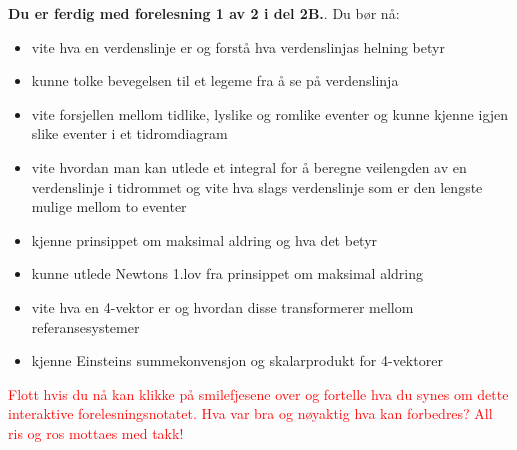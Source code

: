 \documentclass{beamer}
\let\hrefori\href
\renewcommand{\href}[2]{{\setlength{\fboxsep}{1pt}\colorbox{sunset}{\hrefori{#1}{#2}}}}
\newcommand{\pagebutton}[1]{\setbeamertemplate{button}{\tikz\node[inner xsep = 5pt, draw = structure!90, fill = green(ryb), rounded corners = 8pt]{\color{amber}\Large\insertbuttontext};}\beamerbutton{#1}}
\begin{document}
\begin{frame}
\label{oppsummering}
\hyperlink{vv6}{\pagebutton{\small Forrige side}}\href{https://nettskjema.no/a/171403}{ \Changey[1][yellow]{-2}}
{\bf Du er ferdig med forelesning 1 av 2 i del 2B.}. Du bør nå:
\begin{itemize}
\item vite hva en verdenslinje er og forstå hva verdenslinjas helning betyr
\item kunne tolke bevegelsen til et legeme fra å se på verdenslinja
\item vite forsjellen mellom tidlike, lyslike og romlike eventer og kunne kjenne igjen slike eventer i et tidromdiagram
\item vite hvordan man kan utlede et integral for å beregne veilengden av en verdenslinje i tidrommet og vite hva slags verdenslinje som er den lengste mulige mellom to eventer
\item kjenne prinsippet om maksimal aldring og hva det betyr
\item kunne utlede Newtons 1.lov fra prinsippet om maksimal aldring
\item vite hva en 4-vektor er og hvordan disse transformerer mellom referansesystemer
\item kjenne Einsteins summekonvensjon og skalarprodukt for 4-vektorer
\end{itemize}
\textcolor{red}{Flott hvis du nå kan klikke på smilefjesene over og fortelle hva du synes om dette interaktive forelesningsnotatet. Hva var bra og nøyaktig hva kan forbedres? All ris og ros mottaes med takk!}
\end{frame}
\end{document}
